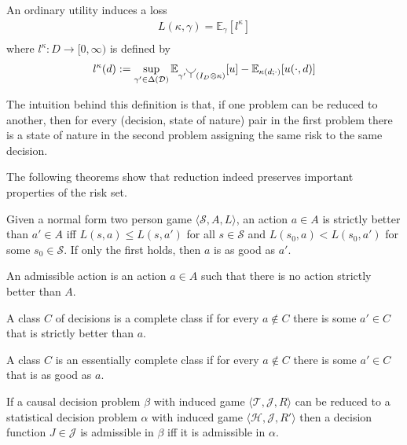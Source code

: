 \begin{definition}
An ordinary utility induces a loss
\begin{align}
    L(\kappa,\gamma) = \mathbb{E}_{\gamma}[l^\kappa]\\
\end{align}
where $l^\kappa:D\to [0,\infty)$ is defined by
\begin{align}
    l^\kappa(d) := \sup_{\gamma'\in \Delta(\mathcal{D})} \mathbb{E}_{\gamma'\splitter{0.15}(I_D\otimes \kappa)}[u] - \mathbb{E}_{\kappa(d;\cdot)}[u(\cdot,d)]\label{eq:induced_l}
\end{align}
\end{definition}


The intuition behind this definition is that, if one problem can be reduced to another, then for every (decision, state of nature) pair in the first problem there is a state of nature in the second problem assigning the same risk to the same decision.

The following theorems show that reduction indeed preserves important properties of the risk set.

\begin{definition}
Given a normal form two person game $\langle \mathscr{S}, A, L\rangle$, an action $a\in A$ is strictly better than $a'\in A$ iff $L(s,a)\leq L(s,a')$ for all $s\in\mathscr{S}$ and $L(s_0,a)<L(s_0,a')$ for some $s_0\in \mathscr{S}$. If only the first holds, then $a$ is as good as $a'$.

An admissible action is an action $a\in A$ such that there is no action strictly better than $A$.
\end{definition}

\begin{definition}
A class $C$ of decisions is a complete class if for every $a\not\in C$ there is some $a'\in C$ that is strictly better than $a$.

A class $C$ is an essentially complete class if for every $a\not\in C$ there is some $a'\in C$ that is as good as $a$.
\end{definition}

\begin{lemma}\label{lem:red_adm}
If a causal decision problem $\beta$ with induced game $\langle \mathscr{T},\mathscr{J}, R\rangle$ can be reduced to a statistical decision problem $\alpha$ with induced game $\langle \mathscr{H},\mathscr{J},R' \rangle$ then a decision function $J\in \mathscr{J}$ is admissible in $\beta$ iff it is admissible in $\alpha$.
\end{lemma}


